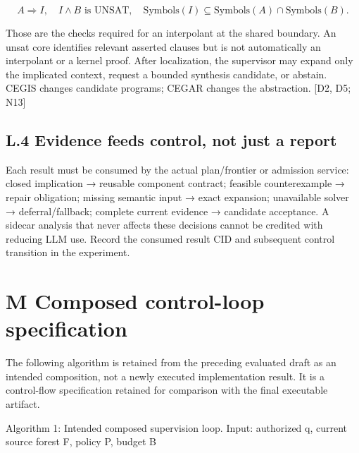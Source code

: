 \documentclass{article}
\begin{document}
\setcounter{equation}{5}
\begin{equation}
A\Rightarrow I,\quad I\land B\text{ is UNSAT},\quad\mathrm{Symbols}(I)\subseteq\mathrm{Symbols}(A)\cap\mathrm{Symbols}(B).
\tag{6}\end{equation}

Those are the checks required for an interpolant at the shared boundary. An unsat core identifies
relevant asserted clauses but is not automatically an interpolant or a kernel proof. After localization,
the supervisor may expand only the implicated context, request a bounded synthesis candidate, or
abstain. CEGIS changes candidate programs; CEGAR changes the abstraction. [D2, D5; N13]

\subsection*{L.4 Evidence feeds control, not just a report}

Each result must be consumed by the actual plan/frontier or admission service: closed implication →
reusable component contract; feasible counterexample → repair obligation; missing semantic input
→ exact expansion; unavailable solver → deferral/fallback; complete current evidence → candidate
acceptance. A sidecar analysis that never affects these decisions cannot be credited with reducing
LLM use. Record the consumed result CID and subsequent control transition in the experiment.




\section*{M Composed control-loop specification}
The following algorithm is retained from the preceding evaluated draft as an intended composition,
not a newly executed implementation result. It is a control-flow specification retained for comparison
with the final executable artifact.

Algorithm 1: Intended composed supervision loop. Input: authorized q, current source forest F,
policy P, budget B
\end{document}
